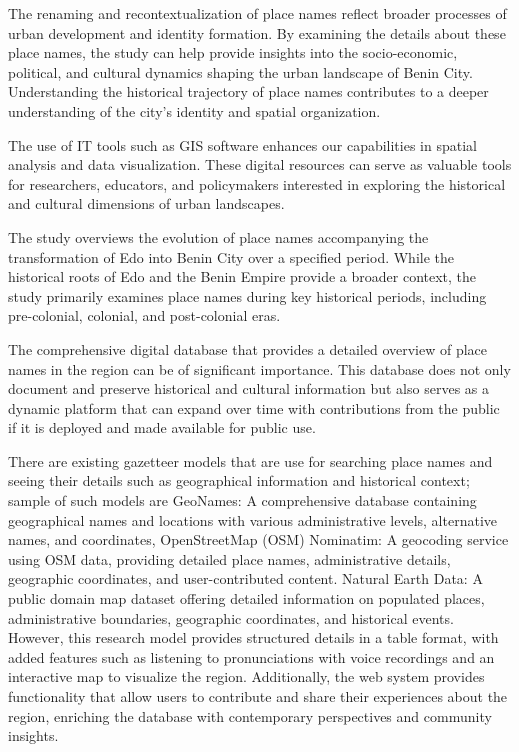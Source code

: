 The renaming and recontextualization of place names reflect broader processes of urban development and identity formation. By examining the details about these place names, the study can help provide insights into the socio-economic, political, and cultural dynamics shaping the urban landscape of Benin City. Understanding the historical trajectory of place names contributes to a deeper understanding of the city's identity and spatial organization.

The use of IT tools such as GIS software enhances our capabilities in spatial analysis and data visualization. These digital resources can serve as valuable tools for researchers, educators, and policymakers interested in exploring the historical and cultural dimensions of urban landscapes.

The study overviews the evolution of place names accompanying the transformation of Edo into Benin City over a specified period. While the historical roots of Edo and the Benin Empire provide a broader context, the study primarily examines place names during key historical periods, including pre-colonial, colonial, and post-colonial eras.

The comprehensive digital database that provides a detailed overview of place names in the region can be of significant importance. This database does not only document and preserve historical and cultural information but also serves as a dynamic platform that can expand over time with contributions from the public if it is deployed and made available for public use.

There are existing gazetteer models that are use for searching place names and seeing their details such as geographical information and historical context; sample of such models are \cite{hill1999implementation}
GeoNames: A comprehensive database containing geographical names and locations with various administrative levels, alternative names, and coordinates, OpenStreetMap (OSM) Nominatim: A geocoding service using OSM data, providing detailed place names, administrative details, geographic coordinates, and user-contributed content\cite{osm_geonames_2016}.
Natural Earth Data: A public domain map dataset offering detailed information on populated places, administrative boundaries, geographic coordinates, and historical events. However, this research model provides structured details in a table format, with added features such as listening to pronunciations with voice recordings and an interactive map to visualize the region. Additionally, the web system provides functionality that allow users to contribute and share their experiences about the region, enriching the database with contemporary perspectives and community insights\cite{natural_earth_data}.

